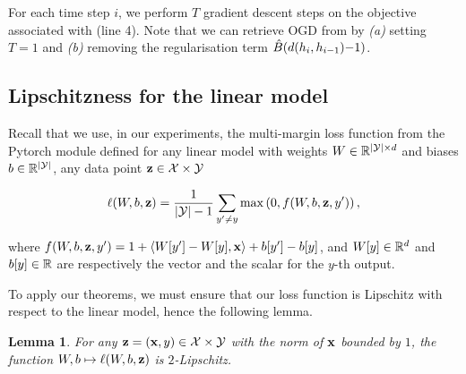 \documentclass{article}
\newtheorem{lemma}[definition]{Lemma}
\begin{document}
For each time step $i$, we perform $T$ gradient descent steps on the objective associated with  (line 4).
Note that we can retrieve OGD from  by {\it (a)} setting $T=1$ and {\it (b)} removing the regularisation term $\hat{B}(d(h_i, h_{i-1}){-}1)$.

\subsection{Lipschitzness for the linear model}
\label{sec:lip-linear}

Recall that we use, in our experiments, the multi-margin loss function from the Pytorch module defined for any linear model with weights $W\in\mathbb{R}^{|\mathcal{Y}|\times d}$ and biases $b\in\mathbb{R}^{|\mathcal{Y}|}$, any data point $\mathbf{z}\in \mathcal{X}\times\mathcal{Y}$

\[\ell(W,b,\mathbf{z})= \frac{1}{|\mathcal{Y}|-1}\sum_{y^\prime \neq y} \max\left(0, f(W,b,\mathbf{z},y') \right), \]

where $f(W,b,\mathbf{z},y')= 1+ \langle W[y']-W[y],\mathbf{x} \rangle+b[y']-b[y]$, and $W[y]\in \mathbb{R}^{d}$ and $b[y]\in\mathbb{R}$ are respectively the vector and the scalar for the $y$-th output.

To apply our theorems, we must ensure that our loss function is Lipschitz with respect to the linear model, hence the following lemma.

\begin{lemma}\label{lemma:lipschitz-linear}
    For any $\mathbf{z}=(\mathbf{x},y)\in\mathcal{X}\times\mathcal{Y}$ with the norm of $\mathbf{x}$ bounded by $1$, the function $W,b\mapsto \ell(W,b,\mathbf{z})$ is $2$-Lipschitz.
\end{lemma}
\end{document}
